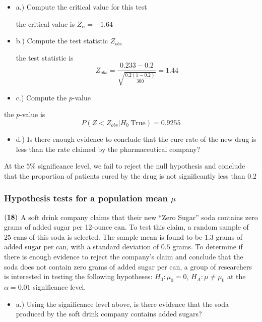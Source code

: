 \documentclass[
]{article}
\providecommand{\tightlist}{%
  \setlength{\itemsep}{0pt}\setlength{\parskip}{0pt}}
\begin{document}
\begin{itemize}
\item
  a.) Compute the critical value for this test

  {the critical value is \(Z_{\alpha} = -1.64\)}
\item
  b.) Compute the test statistic \(Z_{obs}\)

  {the test statistic is
  \[Z_{obs} = \frac{0.233 - 0.2}{\sqrt{\frac{0.2(1-0.2)}{300}}} = 1.44 \]
  }
\item
  c.) Compute the \(p\)-value
\end{itemize}

{the \(p\)-value is \[P(Z < Z_{obs} | H_0 \ \text{True}) = 0.9255 \] }

\begin{itemize}
\tightlist
\item
  d.) Is there enough evidence to conclude that the cure rate of the new
  drug is less than the rate claimed by the pharmaceutical company?
\end{itemize}

{At the \(5\%\) significance level, we fail to reject the null
hypothesis and conclude that the proportion of patients cured by the
drug is not significantly less than \(0.2\) }

\subsubsection{\texorpdfstring{Hypothesis tests for a population mean
\(\mu\)}{Hypothesis tests for a population mean \textbackslash mu}}\label{hypothesis-tests-for-a-population-mean-mu}

\(\bf (18)\) A soft drink company claims that their new ``Zero Sugar''
soda contains zero grams of added sugar per 12-ounce can. To test this
claim, a random sample of \(25\) cans of this soda is selected. The
sample mean is found to be \(1.3\) grams of added sugar per can, with a
standard deviation of \(0.5\) grams. To determine if there is enough
evidence to reject the company's claim and conclude that the soda does
not contain zero grams of added sugar per can, a group of researchers is
interested in testing the following hypotheses: \(H_0: \mu_0 = 0\),
\(H_A: \mu \neq \mu_0\) at the \(\alpha = 0.01\) significance level.

\begin{itemize}
\tightlist
\item
  a.) Using the significance level above, is there evidence that the
  soda produced by the soft drink company contains added sugars?
\end{itemize}
\end{document}
